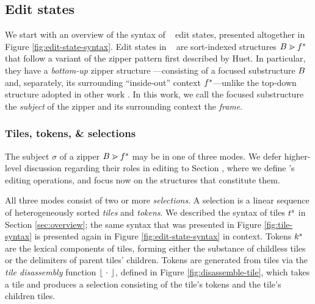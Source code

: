 \subsection{Edit states}



We start with an overview of the syntax of \ty~ edit states,
presented altogether in Figure \ref{fig:edit-state-syntax}.
Edit states in \ty~ are sort-indexed structures
$B \gtrdot f^s$ that follow a variant
of the zipper pattern first described by Huet.
In particular, they have a \emph{bottom-up}
zipper structure ---consisting of a focused substructure
$B$ and, separately,
its surrounding ``inside-out'' context $f^s$---unlike
the top-down structure adopted in other work .
In this work, we call the focused substructure the \emph{subject} of
the zipper and its surrounding context the \emph{frame}.

\subsubsection{Tiles, tokens, \& selections}
The subject $\sigma$ of a zipper $B \gtrdot f^s$
may be in one of three modes.
We defer higher-level discussion regarding their roles in
editing to Section , where we define \ty's editing
operations, and focus now on the structures that constitute them.




All three modes consist of two or more \emph{selections}.
A selection is a linear sequence of heterogeneously
sorted \emph{tiles} and \emph{tokens}.
We described the syntax of tiles $t^s$
in Section \ref{sec:overview};
the same syntax that was presented in Figure \ref{fig:tile-syntax}
is presented again in Figure \ref{fig:edit-state-syntax} in context.
Tokens $k^s$ are the lexical components of tiles, forming either
the substance of childless tiles or the delimiters of parent
tiles' children.
Tokens are generated from tiles via the \emph{tile disassembly} function
$\left\lfloor~\cdot~\right\rfloor$, defined in Figure \ref{fig:disassemble-tile},
which takes a tile and produces
a selection consisting of the tile's tokens
and the tile's children tiles.

